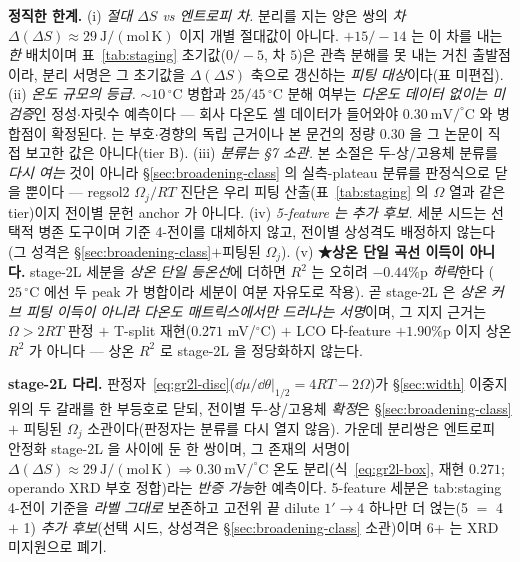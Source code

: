 \begin{warnbox}
\textbf{정직한 한계.} (i) \emph{절대 $\Delta S$ vs 엔트로피 \emph{차}.} 분리를 지는 양은 쌍의 \emph{차}
$\Delta(\Delta S)\approx29\ \mathrm{J/(mol\,K)}$ 이지 개별 절대값이 아니다. $+15/-14$ 는 이 차를 내는 \emph{한}
배치이며 표~\ref{tab:staging} 초기값($0/-5$, 차 $5$)은 관측 분해를 못 내는 거친 출발점이라, 분리 서명은 그
초기값을 $\Delta(\Delta S)$ 축으로 갱신하는 \emph{피팅 대상}이다(표 미편집). (ii) \emph{온도 규모의 등급.}
$\sim10\,^\circ$C 병합과 $25/45\,^\circ$C 분해 여부는 \emph{다온도 데이터 없이는 미검증}인 정성$\cdot$자릿수
예측이다 --- 회사 다온도 셀 데이터가 들어와야 $0.30\ \mathrm{mV/^\circ C}$ 와 병합점이 확정된다.
\cite{schmitt2022} 는 부호$\cdot$경향의 독립 근거이나 본 문건의 정량 $0.30$ 을 그 논문이 직접 보고한 값은
아니다(tier B). (iii) \emph{분류는 §7 소관.} 본 소절은 두-상/고용체 분류를 \emph{다시 여는} 것이 아니라
\S\ref{sec:broadening-class} 의 실측-plateau 분류를 판정식으로 닫을 뿐이다 --- regsol2 $\Omega_j/RT$ 진단은 우리
피팅 산출(표~\ref{tab:staging} 의 $\Omega$ 열과 같은 tier)이지 전이별 문헌 anchor 가 아니다. (iv) \emph{5-feature
는 추가 후보.} 세분 시드는 선택적 병존 도구이며 기준 4-전이를 대체하지 않고, 전이별 상성격도 배정하지 않는다
(그 성격은 \S\ref{sec:broadening-class}$+$피팅된 $\Omega_j$). (v) \textbf{★상온 단일 곡선
이득이 아니다.} stage-2L 세분을 \emph{상온 단일 등온선}에 더하면 $R^2$ 는 오히려 $-0.44\%$p \emph{하락}한다
($25\,^\circ$C 에선 두 peak 가 병합이라 세분이 여분 자유도로 작용). 곧 stage-2L 은 \emph{상온 커브 피팅 이득이
아니라 다온도 매트릭스에서만 드러나는 서명}이며, 그 지지 근거는 $\Omega>2RT$ 판정 $+$ T-split 재현($0.271$
mV/$^\circ$C) $+$ LCO 다-feature $+1.90\%$p 이지 상온 $R^2$ 가 아니다 --- 상온 $R^2$ 로 stage-2L 을 정당화하지 않는다.
\end{warnbox}

\begin{keybox}
\textbf{stage-2L 다리.} 판정자~\eqref{eq:gr2l-disc}($\dd\mu/\dd\theta|_{1/2}=4RT-2\Omega$)가 \S\ref{sec:width}
이중지위의 두 갈래를 한 부등호로 닫되, 전이별 두-상/고용체 \emph{확정}은 \S\ref{sec:broadening-class} $+$ 피팅된
$\Omega_j$ 소관이다(판정자는 분류를 다시 열지 않음). 가운데 분리쌍은 엔트로피 안정화 stage-2L 을 사이에 둔 한
쌍이며, 그 존재의 서명이 $\Delta(\Delta S)\approx29\ \mathrm{J/(mol\,K)}\Rightarrow0.30\ \mathrm{mV/^\circ C}$
온도 분리(식~\eqref{eq:gr2l-box}, 재현 $0.271$; operando XRD 부호 정합\cite{schmitt2022})라는 \emph{반증 가능}한
예측이다. 5-feature 세분은 tab:staging 4-전이 기준을 \emph{라벨 그대로} 보존하고 고전위 끝 dilute $1'\!\to\!4$
하나만 더 얹는(5 $=$ 4 $+$ 1) \emph{추가 후보}(선택 시드, 상성격은 \S\ref{sec:broadening-class} 소관)이며 6+ 는 XRD 미지원으로 폐기.
\end{keybox}

